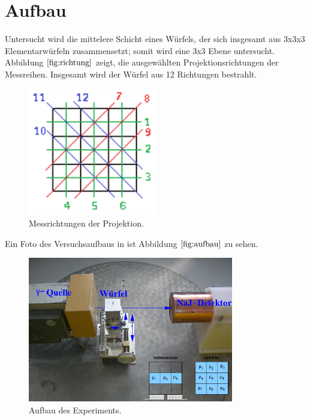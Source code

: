 \section{Aufbau}

Untersucht wird die mittelere Schicht eines Würfels, der sich insgesamt aus 3x3x3 Elementarwürfeln zusammensetzt; somit wird eine 3x3 Ebene untersucht.
Abbildung $\ref{fig:richtung}$ zeigt, die ausgewählten Projektionsrichtungen der Messreihen.
Insgesamt wird der Würfel aus 12 Richtungen bestrahlt.

\begin{figure}[H]
  \centering
  \includegraphics[width=0.5\textwidth]{Bilder/richtung.png}
  \caption{Messrichtungen der Projektion.}
  \label{fig:richtung}
\end{figure}

Ein Foto des Versuchsaufbaus in ist Abbildung $\ref{fig:aufbau}$ zu sehen.
\begin{figure}[H]
  \centering
  \includegraphics[width=0.8\textwidth]{Bilder/aufbau.png}
  \caption{Aufbau des Experiments.\cite{anleitung}}
  \label{fig:aufbau}
\end{figure}

